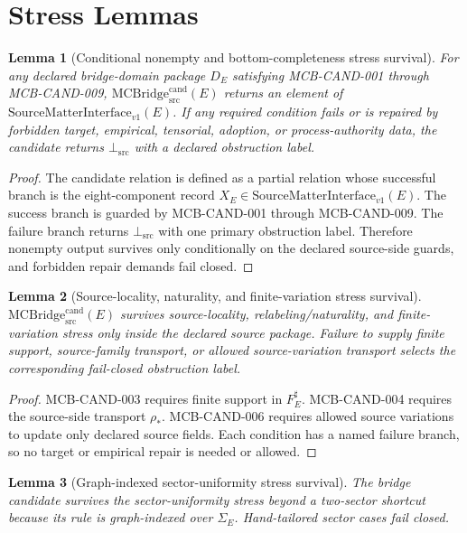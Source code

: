 \documentclass[11pt]{article}
\newcommand{\MCBridgeCand}{\mathrm{MCBridge}_{\mathrm{src}}^{\mathrm{cand}}}
\newcommand{\SMI}{\mathrm{SourceMatterInterface}_{v1}}
\newcommand{\BottomSrc}{\bot_{\mathrm{src}}}
\newtheorem{lemma}{Lemma}
\begin{document}
\section{Stress Lemmas}

\begin{lemma}[Conditional nonempty and bottom-completeness stress survival]
For any declared bridge-domain package \(D_E\) satisfying MCB-CAND-001
through MCB-CAND-009, \(\MCBridgeCand(E)\) returns an element of
\(\SMI(E)\). If any required condition fails or is repaired by forbidden
target, empirical, tensorial, adoption, or process-authority data, the
candidate returns \(\BottomSrc\) with a declared obstruction label.
\end{lemma}

\begin{proof}
The candidate relation is defined as a partial relation whose successful
branch is the eight-component record \(X_E\in\SMI(E)\). The success branch is
guarded by MCB-CAND-001 through MCB-CAND-009. The failure branch returns
\(\BottomSrc\) with one primary obstruction label. Therefore nonempty output
survives only conditionally on the declared source-side guards, and forbidden
repair demands fail closed.
\end{proof}

\begin{lemma}[Source-locality, naturality, and finite-variation stress survival]
\(\MCBridgeCand(E)\) survives source-locality, relabeling/naturality, and
finite-variation stress only inside the declared source package. Failure to
supply finite support, source-family transport, or allowed source-variation
transport selects the corresponding fail-closed obstruction label.
\end{lemma}

\begin{proof}
MCB-CAND-003 requires finite support in \(F_E^\sharp\). MCB-CAND-004
requires the source-side transport \(\rho_*\). MCB-CAND-006 requires allowed
source variations to update only declared source fields. Each condition has a
named failure branch, so no target or empirical repair is needed or allowed.
\end{proof}

\begin{lemma}[Graph-indexed sector-uniformity stress survival]
The bridge candidate survives the sector-uniformity stress beyond a
two-sector shortcut because its rule is graph-indexed over \(\Sigma_E\).
Hand-tailored sector cases fail closed.
\end{lemma}
\end{document}
